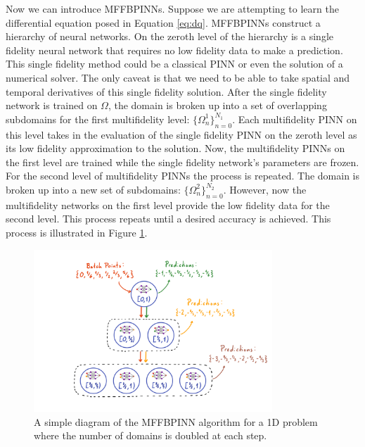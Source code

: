 \documentclass[12pt]{article}
\begin{document}
\par Now we can introduce MFFBPINNs. Suppose we are attempting to learn the differential equation posed in Equation \ref{eq:dq}. MFFBPINNs construct a hierarchy of neural networks. On the zeroth level of the hierarchy is a single fidelity neural network that requires no low fidelity data to make a prediction. This single fidelity method could be a classical PINN or even the solution of a numerical solver. The only caveat is that we need to be able to take spatial and temporal derivatives of this single fidelity solution. After the single fidelity network is trained on $\Omega$, the domain is broken up into a set of overlapping subdomains for the first multifidelity level: $\{\Omega^1_n\}_{n=0}^{N_1}$. Each multifidelity PINN on this level takes in the evaluation of the single fidelity PINN on the zeroth level as its low fidelity approximation to the solution. Now, the multifidelity PINNs on the first level are trained while the single fidelity network's parameters are frozen. For the second level of multifidelity PINNs the process is repeated. The domain is broken up into a new set of subdomains: $\{\Omega^2_n\}_{n=0}^{N_2}$. However, now the multifidelity networks on the first level provide the low fidelity data for the second level. This process repeats until a desired accuracy is achieved. This process is illustrated in Figure \ref{fig:mffbpinn}.

\begin{figure}
\centering
\includegraphics[width=0.8\textwidth]{imgs/mffbpinn}
\caption{A simple diagram of the MFFBPINN algorithm for a 1D problem where the number of domains is doubled at each step.}
\label{fig:mffbpinn}
\end{figure}
\end{document}
